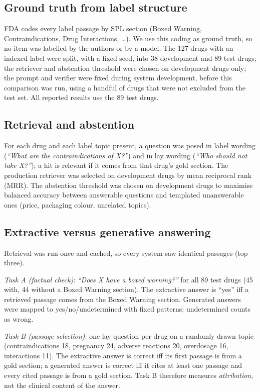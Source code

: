 \documentclass[conference]{IEEEtran}
\begin{document}
\subsection{Ground truth from label structure}
FDA codes every label passage by SPL section (Boxed Warning, Contraindications, Drug Interactions, \dots). We use this coding as ground truth, so no item was labelled by the authors or by a model. The 127 drugs with an indexed label were split, with a fixed seed, into 38 development and 89 test drugs; the retriever and abstention threshold were chosen on development drugs only; the prompt and verifier were fixed during system development, before this comparison was run, using a handful of drugs that were not excluded from the test set. All reported results use the 89 test drugs.

\subsection{Retrieval and abstention}
For each drug and each label topic present, a question was posed in label wording (\emph{``What are the contraindications of X?''}) and in lay wording (\emph{``Who should not take X?''}); a hit is relevant if it comes from that drug's gold section. The production retriever was selected on development drugs by mean reciprocal rank (MRR). The abstention threshold was chosen on development drugs to maximise balanced accuracy between answerable questions and templated unanswerable ones (price, packaging colour, unrelated topics).

\subsection{Extractive versus generative answering}
Retrieval was run once and cached, so every system saw identical passages (top three).

\emph{Task A (factual check)}: \emph{``Does X have a boxed warning?''} for all 89 test drugs (45 with, 44 without a Boxed Warning section). The extractive answer is ``yes'' iff a retrieved passage comes from the Boxed Warning section. Generated answers were mapped to yes/no/undetermined with fixed patterns; undetermined counts as wrong.

\emph{Task B (passage selection)}: one lay question per drug on a randomly drawn topic (contraindications 18, pregnancy 24, adverse reactions 20, overdosage 16, interactions 11). The extractive answer is correct iff its first passage is from a gold section; a generated answer is correct iff it cites at least one passage and every cited passage is from a gold section. Task B therefore measures \emph{attribution}, not the clinical content of the answer.
\end{document}
